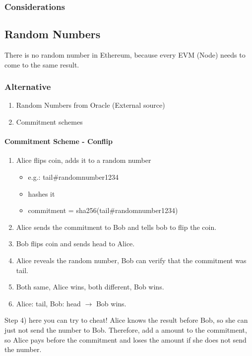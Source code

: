 \subsubsection{Considerations}

\subsection{Random Numbers}
There is no random number in Ethereum, because every EVM (Node) needs to come to the same result.

\subsubsection{Alternative}
\begin{enumerate}
  \item Random Numbers from Oracle (External source)
  \item Commitment schemes
\end{enumerate}
 
\paragraph{Commitment Scheme - Conflip}
\begin{enumerate}
  \item Alice flips coin, adds it to a random number
  \begin{itemize}
    \item e.g.: tail\#randomnumber1234
    \item hashes it
    \item commitment = sha256(tail\#randomnumber1234)
  \end{itemize}
  \item Alice sends the commitment to Bob and tells bob to flip the coin.
  \item Bob flips coin and sends head to Alice.
  \item Alice reveals the random number, Bob can verify that the commitment was tail.
  \item Both same, Alice wins, both different, Bob wins.
  \item Alice: tail, Bob: head $\rightarrow$ Bob wins.
\end{enumerate}
Step 4) here you can try to cheat! 
Alice knows the result before Bob, so she can just not send the number to Bob.
Therefore, add a amount to the commitment, so Alice pays before the commitment and loses the amount if she does not send the number.

